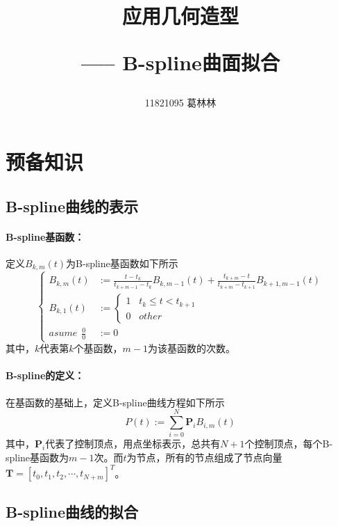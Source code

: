\documentclass[10pt]{article}
\title{应用几何造型 \hspace{2pt}\hspace{2pt} \begin{large}----- \hspace{2pt} B-spline曲面拟合 \end{large} }
\author{11821095 葛林林}
\begin{document}
\maketitle


\section{预备知识}
\subsection{B-spline曲线的表示}
\paragraph{B-spline基函数：}
定义$B_{k,m}(t)$为B-spline基函数如下所示
$$
\left\{
\begin{array}{rl}
B_{k,m}(t)&:=\displaystyle\frac{t-t_k}{t_{k+m-1}-t_k}B_{k,m-1}(t)+\frac{t_{k+m}-t}{t_{k+m}-t_{k+1}}B_{k+1,m-1}(t)\\
B_{k,1}(t)&:=
\left\{
\begin{array}{l}
1 \hspace{10pt} t_k \leq t < t_{k+1} \\
0 \hspace{10pt} other
\end{array}
\right.\\
asume \hspace{5pt} \frac{0}{0}&:=0
\end{array}
\right. 
$$
其中，$k$代表第$k$个基函数，$m-1$为该基函数的次数。
\paragraph{B-spline的定义：}在基函数的基础上，定义B-spline曲线方程如下所示
$$P(t):=\sum_{i=0}^{N}\bm{P}_iB_{i,m}(t)$$
其中，$\bm{P}_i$代表了控制顶点，用点坐标表示，总共有$N+1$个控制顶点，每个B-spline基函数为$m-1$次。而$t$为节点，所有的节点组成了节点向量$\bm{T}=[t_{0},t_1,t_2,\cdots,t_{N+m}]^T$。

\subsection{B-spline曲线的拟合}
\end{document}
